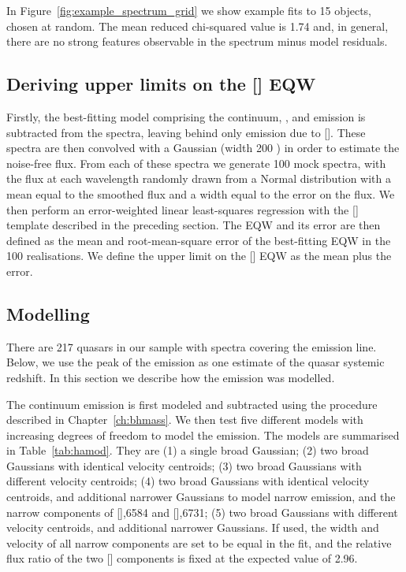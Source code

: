 In Figure~\ref{fig:example_spectrum_grid} we show example fits to 15 objects, chosen at random. 
The mean reduced chi-squared value is 1.74 and, in general, there are no strong features observable in the spectrum minus model residuals.

\subsection{Deriving upper limits on the [] EQW}

Firstly, the best-fitting model comprising the continuum, , and \hb emission is subtracted from the spectra, leaving behind only emission due to [].
These spectra are then convolved with a Gaussian (width 200 \kms) in order to estimate the noise-free flux.
From each of these spectra we generate 100 mock spectra, with the flux at each wavelength randomly drawn from a Normal distribution with a mean equal to the smoothed flux and a width equal to the error on the flux. 
We then perform an error-weighted linear least-squares regression with the [] template described in the preceding section.
The EQW and its error are then defined as the mean and root-mean-square error of the best-fitting EQW in the 100 realisations.
We define the upper limit on the [] EQW as the mean plus the error. 

\subsection{Modelling \hans}
\label{sec:hamodel}

There are 217 quasars in our sample with spectra covering the \ha emission line. 
Below, we use the peak of the \ha emission as one estimate of the quasar systemic redshift. 
In this section we describe how the \ha emission was modelled. 

The continuum emission is first modeled and subtracted using the procedure described in Chapter~\ref{ch:bhmass}. 
We then test five different models with increasing degrees of freedom to model the \ha emission. 
The models are summarised in Table~\ref{tab:hamod}. 
They are (1) a single broad Gaussian; (2) two broad Gaussians with identical velocity centroids; (3) two broad Gaussians with different velocity centroids; (4) two broad Gaussians with identical velocity centroids, and additional narrower Gaussians to model narrow \ha emission, and the narrow components of [],6584 and [],6731; (5) two broad Gaussians with different velocity centroids, and additional narrower Gaussians. 
If used, the width and velocity of all narrow components are set to be equal in the fit, and the relative flux ratio of the two [] components is fixed at the expected value of 2.96.

